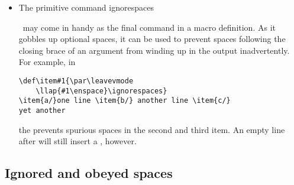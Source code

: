 \documentclass{book}
\begin{document}
\begin{itemize}
\item The primitive command \csterm ignorespaces\par\ 
may come in handy as the final command in a macro definition.
As it gobbles up
optional spaces, it can be used to prevent spaces following the
closing brace of an argument from winding up in the output
inadvertently. For example, in
\begin{verbatim}
\def\item#1{\par\leavevmode
    \llap{#1\enspace}\ignorespaces}
\item{a/}one line \item{b/} another line \item{c/}
yet another
\end{verbatim} 
the  prevents spurious
spaces in the second and third item.
An empty line
after  will still insert a , however.
\end{itemize}

\subsection{Ignored and obeyed spaces}
\end{document}
